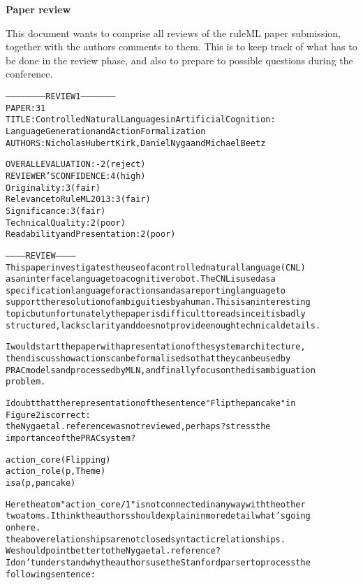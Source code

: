 \documentclass[oribibl]{llncs}
\newcommand{\comment}[1]{{\color{red} #1}}
\begin{document}
\begin{center}
  
{\huge \textbf{Paper review}}\\
\end{center}

This document wants to comprise all reviews of the ruleML paper submission, together
with the authors comments to them. This is to keep track of what has to be done in
the review phase, and also to prepare to possible questions during the conference.

\begin{alltt}
----------------------- REVIEW 1 ---------------------
PAPER: 31
TITLE: Controlled Natural Languages in Artificial Cognition: 
Language Generation and Action Formalization
AUTHORS: Nicholas Hubert Kirk, Daniel Nyga and Michael Beetz

OVERALL EVALUATION: -2 (reject)
REVIEWER'S CONFIDENCE: 4 (high)
Originality: 3 (fair)
Relevance to RuleML 2013: 3 (fair)
Significance: 3 (fair)
Technical Quality: 2 (poor)
Readability and Presentation: 2 (poor)

----------- REVIEW -----------
This paper investigates the use of a controlled natural language (CNL) 
as an interface language to a cognitive robot. The CNL is used as a 
specification language for actions and as a reporting language to 
support the resolution of ambiguities by a human. This is an interesting
 topic but unfortunately the paper is difficult to read since it is badly
  structured, lacks clarity and does not provide enough technical details.

I would start the paper with a presentation of the system architecture, 
then discuss how actions can be formalised so that they can be used by
 PRAC models and processed by MLN, and finally focus on the disambiguation 
 problem.

I doubt that the representation of the sentence "Flip the pancake" in 
Figure 2 is correct:
\comment{the Nyga et al. reference was not reviewed, perhaps? stress the 
importance of the PRAC system?}

   action_core(Flipping)
   action_role(p, Theme)
   isa(p, pancake)

Here the atom "action_core/1" is not connected in any way with the other 
two atoms. I think the authors should explain in more detail what's going 
on here.
\comment{the above relationships are not closed syntactic relationships. 
We should point better to the Nyga et al. reference?}
I don't understand why the authors use the Stanford parser to process the
 following sentence:


\end{alltt}
\end{document}
